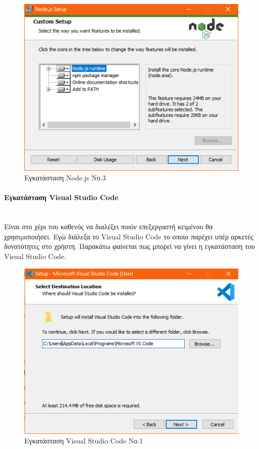 \documentclass[a4paper,12pt]{article}
\newcommand{\myparagraph}[1]{\paragraph{#1}\mbox{}\\}
\begin{document}
				\begin{figure}[!htb]
					\begin{center}
						\caption{Εγκατάσταση Node.js Νο.3}
						\vspace*{0.5cm}
						\includegraphics[width=0.9\linewidth]{nod2} 
					\end{center}
				\end{figure}
				\clearpage
				\myparagraph{Εγκατάσταση Visual Studio Code}
				Είναι στο χέρι του καθενός να διαλέξει ποιόν επεξεργαστή κειμένου θα χρησιµοποιήσει. Εγώ διάλεξα το Visual Studio Code το οποίο
				παρέχει υπέρ αρκετές δυνατότητες στο χρήστη. Παρακάτω φαίνεται πως μπορεί να γίνει η εγκατάσταση του Visual Studio Code.
				
				\begin{figure}[!htb]
					\begin{center}
						\caption{Εγκατάσταση Visual Studio Code Νο.1}
						\vspace*{0.5cm}
						\includegraphics[width=0.9\linewidth]{vsc1} 
					\end{center}
				\end{figure}
\end{document}
